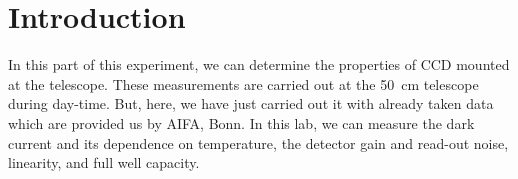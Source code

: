 \section{Introduction}
In this part of this experiment, we can determine the properties of CCD mounted at the telescope. These measurements are carried out at the \SI{50}{\cm} telescope during day-time. But, here, we have just carried out it with already taken data which are provided us by AIFA, Bonn. In this lab, we can measure the dark current and its dependence on temperature, the detector gain and read-out noise, linearity, and full well capacity.
